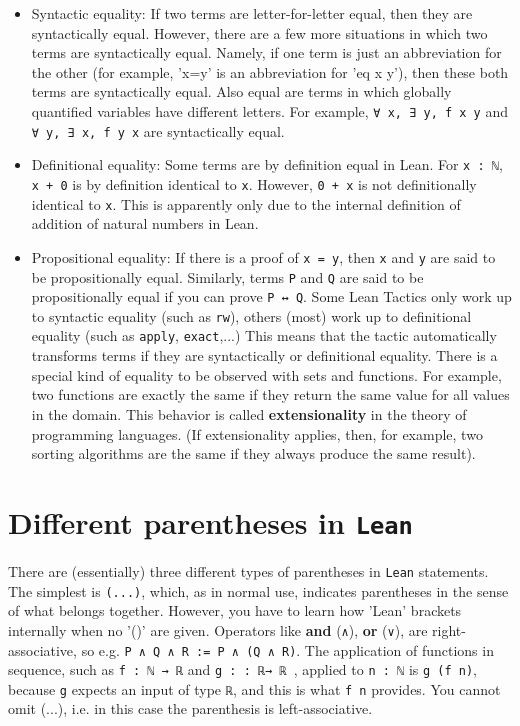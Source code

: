 \documentclass{memoir}
\begin{document}
\begin{itemize}
\item Syntactic equality: If two terms are letter-for-letter equal, then they are syntactically equal. However, there are a few more situations in which two terms are syntactically equal. Namely, if one term is just an abbreviation for the other (for example, 'x=y' is an abbreviation for 'eq x y'), then these both terms are syntactically equal. Also equal are terms in which globally quantified variables have different letters. For example, \Verb|∀ x, ∃ y, f x y| and \Verb|∀ y, ∃ x, f y x| are syntactically equal.\item Definitional equality: Some terms are by definition equal in Lean. For \Verb|x : ℕ|, \Verb|x + 0| is by definition identical to \Verb|x|. However, \Verb|0 + x| is not   definitionally identical to \Verb|x|. This is apparently only due to the     internal definition of addition of natural numbers in Lean.\item Propositional equality: If there is a proof of \Verb|x = y|, then \Verb|x| and \Verb|y| are said to be propositionally equal. Similarly, terms \Verb|P| and \Verb|Q| are said to be propositionally equal if you can prove \Verb|P ↔ Q|. Some Lean Tactics only work up to syntactic equality (such as \Verb|rw|), others (most) work up to definitional equality (such as \Verb|apply|, \Verb|exact|,...) This means that the tactic automatically transforms terms if they are syntactically or definitional equality. There is a special kind of equality to be observed with sets and functions. For example, two functions are exactly the same if they return the same value for all values in the domain. This behavior is called \textbf{extensionality} in the theory of programming languages. (If extensionality applies, then, for example, two sorting algorithms are the same if they always produce the same result).
\end{itemize}




\section{Different parentheses in \Verb|Lean|}

There are (essentially) three different types of parentheses in \Verb|Lean| statements. The simplest is \Verb|(...)|, which, as in normal use, indicates parentheses in the sense of what belongs together. However, you have to learn how 'Lean' brackets internally when no '()' are given. Operators like \textbf{and} (\Verb|∧|), \textbf{or} (\Verb|∨|), are right-associative, so e.g. \Verb|P ∧ Q ∧ R := P ∧ (Q ∧ R)|. The application of functions in sequence, such as \Verb|f : ℕ → ℝ| and \Verb|g : : ℝ→ ℝ |, applied to \Verb|n : ℕ| is \Verb|g (f n)|, because \Verb|g| expects an input of type \Verb|ℝ|, and this is what \Verb|f n| provides. You cannot omit (...), i.e. in this case the parenthesis is left-associative.
\end{document}
